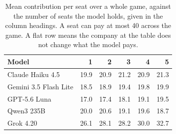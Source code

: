 \begin{table}[t]
\centering
\small
\setlength{\tabcolsep}{2.5pt}%
\caption{Mean contribution per seat over a whole game, against the number of seats the model holds, given in the column headings. A seat can pay at most 40 across the game. A flat row means the company at the table does not change what the model pays.}
\label{tab:mixed-comp}
\begin{tabular}{lrrrrr}
\toprule
Model & 1 & 2 & 3 & 4 & 5 \\
\midrule
Claude Haiku 4.5 & 19.9 & 20.9 & 21.2 & 20.9 & 21.3 \\
Gemini 3.5 Flash Lite & 18.5 & 18.9 & 19.4 & 19.8 & 19.9 \\
GPT-5.6 Luna & 17.0 & 17.4 & 18.1 & 19.1 & 19.5 \\
Qwen3 235B & 20.0 & 20.6 & 19.1 & 19.6 & 18.7 \\
Grok 4.20 & 26.1 & 28.1 & 28.2 & 30.0 & 32.7 \\
\bottomrule
\end{tabular}
\end{table}
